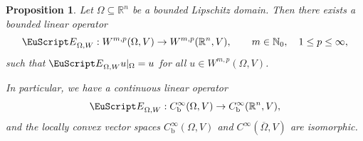 \documentclass[10pt,a4paper]{amsart}
\newtheorem{proposition}[theorem]{Proposition}
\theoremstyle{definition}
\theoremstyle{remark}
\numberwithin{equation}{section}
\newcommand{\bbN}{{\mathbb N}}
\newcommand{\bbR}{{\mathbb R}}
\newcommand{\euE}{{\EuScript E}}
\newcommand{\closure}{\overline}
\renewcommand{\restriction}{|}
\newcommand{\Domain}{{\Omega}}
\newcommand{\Extension}{\euE}
\newcommand{\Wint}{W}
\newcommand{\VEC}{{V}}
\newcommand{\bounded}{\mathrm{b}}
\begin{document}
\begin{proposition}\label{proposition:rogers-operator}
    Let $\Domain \subseteq \bbR^{n}$ be a bounded Lipschitz domain.
    Then there exists a bounded linear operator 
    \begin{align}\label{math:rogers-operator:sobolev}
        \Extension_{\Domain,W} : \Wint^{m,p}(\Domain,\VEC) \to \Wint^{m,p}(\bbR^{n},\VEC),
        \qquad 
        m \in \bbN_{0}, \quad 1 \leq p \leq \infty,
    \end{align}
    such that $\Extension_{\Domain,W} u \restriction_{\Domain} = u$ for all $u \in \Wint^{m,p}(\Domain,\VEC)$.

    In particular, we have a continuous linear operator 
    \begin{align}\label{math:rogers-operator:smooth}
        \Extension_{\Domain,W} : C^{\infty}_{\bounded}(\Domain,\VEC) \to C^{\infty}_{\bounded}(\bbR^{n},\VEC),
    \end{align}
    and the locally convex vector spaces $C^{\infty}_{\bounded}(\Domain,\VEC)$ and $C^{\infty}(\closure\Domain,\VEC)$ are isomorphic.
\end{proposition}
\end{document}
